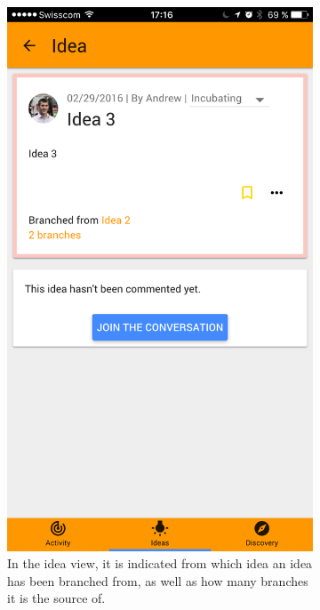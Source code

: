 \documentclass[a4paper,12pt,twoside]{article}
\begin{document}
\begin{figure}[!htb]
    \begin{subfigure}[t]{.48\textwidth}
        \centering
        \includegraphics[width=.67\textwidth]{images/branches_idea.png}
        \caption{In the idea view, it is indicated from which idea an idea has been branched from, as well as how many branches it is the source of.}
    \end{subfigure}
    \hfill
    \begin{subfigure}[t]{.48\textwidth}
        \centering

\end{subfigure}
\end{figure}
\end{document}
